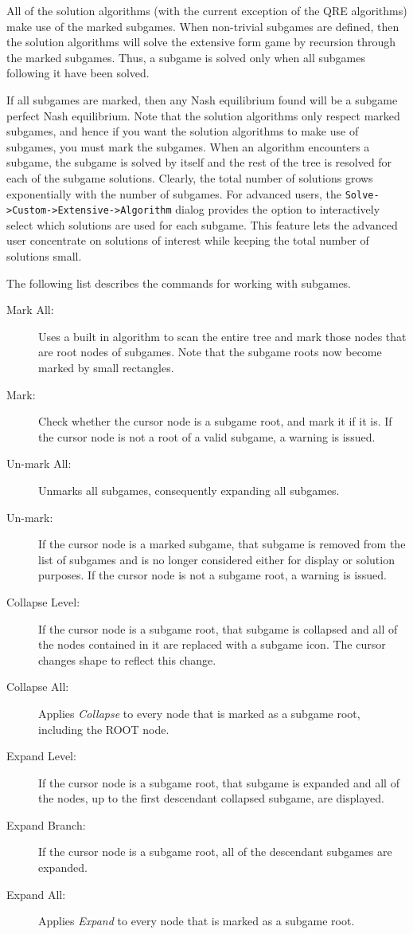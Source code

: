 {All of the solution algorithms (with the current exception of the 
QRE algorithms) make use of the marked subgames.  When non-trivial 
subgames are defined, then the solution algorithms will solve the 
extensive form game by recursion through the marked subgames.  Thus, a 
subgame is solved only when all subgames following it have been 
solved.  

If all subgames are marked, then any Nash equilibrium found will be a 
subgame perfect Nash equilibrium.  
Note that the solution algorithms only 
respect marked subgames, and hence if you want the solution 
algorithms to make use of subgames, you must mark the subgames.  
When an algorithm encounters a subgame, the subgame is solved by itself and
the rest of the tree is resolved for each of the subgame solutions.  Clearly,
the total number of solutions grows exponentially with the number of subgames.
For advanced users, the {\tt Solve->Custom->Extensive->Algorithm} dialog provides 
the option to interactively select
which solutions are used for each subgame.  This feature lets the advanced user
concentrate on solutions of interest while keeping the total number of solutions
small.  

The following list describes the commands for working with subgames. 
\begin{description}
\item[Mark All:] Uses a built in algorithm to scan the entire tree and mark
those nodes that are root nodes of subgames.  Note that the subgame roots
now become marked by small rectangles.
\item[Mark:] Check whether the cursor node is a subgame root, and mark 
it if it is.  If the cursor node is 
not a root of a valid subgame, a warning is issued. 
\item[Un-mark All:] Unmarks all subgames, consequently expanding all
subgames.
\item[Un-mark:] If the cursor node is a marked subgame, that subgame is removed
from the list of subgames and is no longer considered either for display or
solution purposes.  If the cursor node is not a subgame root, a warning is
issued.
\item[Collapse Level:] If the cursor node is a subgame root, that subgame is 
collapsed and all of the nodes contained in it are replaced with a subgame 
icon.  The cursor changes shape to reflect this change.
\item[Collapse All:] Applies {\em Collapse} to every node that is marked as a 
subgame root, including the ROOT node.
\item[Expand Level:] If the cursor node is a subgame root, that subgame is expanded
and all of the nodes, up to the first descendant collapsed subgame,
are displayed.
\item[Expand Branch:] If the cursor node is a subgame root, all of the
descendant subgames are expanded.
\item[Expand All:] Applies {\em Expand} to every node that is marked as a 
subgame root.
\end{description}


}
